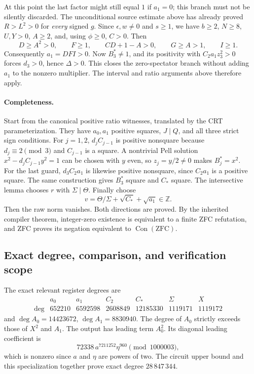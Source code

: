 At this point the last factor might still equal $1$ if $a_1=0$; this branch
must not be silently discarded. The unconditional source estimate above
has already proved $R>L^2>0$ for \emph{every} signed $g$. Since
$\epsilon,w\ne0$ and $s\ge1$, we have $b\ge2$, $N\ge8$, $U,Y>0$,
$A\ge2$, and, using $\phi\ge0$, $C>0$. Then
\[
 D\ge A^2>0,\qquad F\ge1,\qquad
 CD+1-A>0,\qquad G\ge A>1,\qquad I\ge1.
\]
Consequently $a_1=DFI>0$. Now $B_3^*\ne1$, and its positivity with
$C_2a_1z_3^2>0$ forces $d_3>0$, hence $\Delta>0$. This closes the
zero-spectator branch without adding $a_1$ to the nonzero multiplier.
The interval and ratio arguments above therefore apply.

\paragraph{Completeness.}
Start from the canonical positive ratio witnesses, translated by the CRT
parameterization. They have $a_0,a_1$ positive squares, $J\mid Q$, and all
three strict sign conditions. For $j=1,2$, $d_jC_{j-1}$ is positive
nonsquare because $d_j\equiv2\pmod3$ and $C_{j-1}$ is a square.
A nontrivial Pell solution $x^2-d_jC_{j-1}y^2=1$ can be chosen with $y$
even, so $z_j=y/2\ne0$ makes $B_j^*=x^2$. For the last guard,
$d_3C_2a_1$ is likewise positive nonsquare, since $C_2a_1$ is a positive
square. The same construction gives $B_3^*$ square and $C_*$ square.
The intersective lemma chooses $r$ with $\Sigma\mid\Theta$. Finally choose
\[
 v=\Theta/\Sigma+\sqrt{C_*}+\sqrt{a_1}\in\mathbb Z.
\]
Then the raw norm vanishes. Both directions are proved. By the inherited
compiler theorem, integer-zero existence is equivalent to a finite ZFC
refutation, and ZFC proves its negation equivalent to
$\operatorname{Con}(\mathrm{ZFC})$.

\subsection{Exact degree, comparison, and verification scope}
The exact relevant register degrees are
\[
\begin{array}{c|rrrrrr}
 &a_0&a_1&C_2&C_*&\Sigma&X\\\hline
 \deg&652210&6592598&2608849&12185330&1119171&1119172
\end{array}
\]
and $\deg A_0=14423672$, $\deg A_1=8830940$. The degree of $A_0$
strictly exceeds those of $X^2$ and $A_1$. The output has leading term
$A_0^2$. Its diagonal leading coefficient is
\[
 72338\,a^{7211252}\eta^{960}\pmod{1000003},
\]
which is nonzero since $a$ and $\eta$ are powers of two. The circuit upper
bound and this specialization together prove exact degree $28\,847\,344$.

